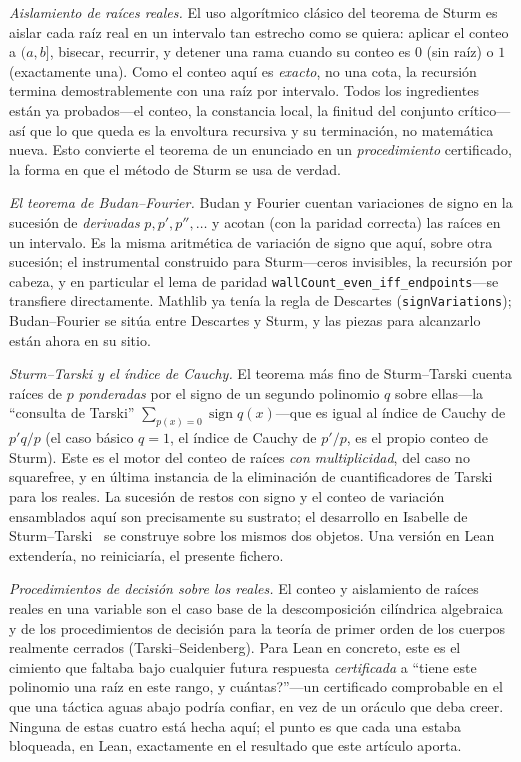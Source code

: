 \documentclass[11pt]{article}
\newcommand{\lean}[1]{\texttt{#1}}
\begin{document}
\emph{Aislamiento de ra\'ices reales.} El uso algor\'itmico cl\'asico del teorema de Sturm es aislar
cada ra\'iz real en un intervalo tan estrecho como se quiera: aplicar el conteo a $(a,b]$, bisecar,
recurrir, y detener una rama cuando su conteo es $0$ (sin ra\'iz) o $1$ (exactamente una). Como el
conteo aqu\'i es \emph{exacto}, no una cota, la recursi\'on termina demostrablemente con una ra\'iz
por intervalo. Todos los ingredientes est\'an ya probados---el conteo, la constancia local, la
finitud del conjunto cr\'itico---as\'i que lo que queda es la envoltura recursiva y su terminaci\'on,
no matem\'atica nueva. Esto convierte el teorema de un enunciado en un \emph{procedimiento}
certificado, la forma en que el m\'etodo de Sturm se usa de verdad.

\emph{El teorema de Budan--Fourier.} Budan y Fourier cuentan variaciones de signo en la sucesi\'on
de \emph{derivadas} $p,p',p'',\dots$ y acotan (con la paridad correcta) las ra\'ices en un
intervalo. Es la misma aritm\'etica de variaci\'on de signo que aqu\'i, sobre otra sucesi\'on; el
instrumental construido para Sturm---ceros invisibles, la recursi\'on por cabeza, y en particular el
lema de paridad \lean{wallCount\_even\_iff\_endpoints}---se transfiere directamente. Mathlib ya
ten\'ia la regla de Descartes (\lean{signVariations}); Budan--Fourier se sit\'ua entre Descartes y
Sturm, y las piezas para alcanzarlo est\'an ahora en su sitio.

\emph{Sturm--Tarski y el \'indice de Cauchy.} El teorema m\'as fino de Sturm--Tarski cuenta ra\'ices
de $p$ \emph{ponderadas} por el signo de un segundo polinomio $q$ sobre ellas---la ``consulta de
Tarski'' $\sum_{p(x)=0}\operatorname{sign} q(x)$---que es igual al \'indice de Cauchy de $p'q/p$ (el
caso b\'asico $q=1$, el \'indice de Cauchy de $p'/p$, es el propio conteo de Sturm). Este es el motor
del conteo de ra\'ices \emph{con multiplicidad}, del caso no squarefree, y en \'ultima instancia de la eliminaci\'on de
cuantificadores de Tarski para los reales. La sucesi\'on de restos con signo y el conteo de
variaci\'on ensamblados aqu\'i son precisamente su sustrato; el desarrollo en Isabelle de
Sturm--Tarski~\cite{litarski,libudan} se construye sobre los mismos dos objetos. Una versi\'on en
Lean extender\'ia, no reiniciar\'ia, el presente fichero.

\emph{Procedimientos de decisi\'on sobre los reales.} El conteo y aislamiento de ra\'ices reales en
una variable son el caso base de la descomposici\'on cil\'indrica algebraica y de los procedimientos
de decisi\'on para la teor\'ia de primer orden de los cuerpos realmente cerrados
(Tarski--Seidenberg). Para Lean en concreto, este es el cimiento que faltaba bajo cualquier futura
respuesta \emph{certificada} a ``\textquestiondown tiene este polinomio una ra\'iz en este rango, y
cu\'antas?''---un certificado comprobable en el que una t\'actica aguas abajo podr\'ia confiar, en
vez de un or\'aculo que deba creer. Ninguna de estas cuatro est\'a hecha aqu\'i; el punto es que cada
una estaba bloqueada, en Lean, exactamente en el resultado que este art\'iculo aporta.
\end{document}
